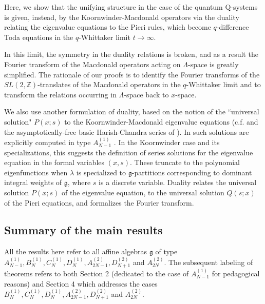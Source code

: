 \documentclass[12pt]{amsart}
\newcommand{\g}{{\mathfrak{g}}}
\newcommand{\Z}{{\mathbb Z}}
\newcommand{\lL}{{\Lambda}}
\numberwithin{equation}{section}
\begin{document}
Here, we show that the unifying structure in the case of the quantum Q-systems 
is given, instead, by the Koornwinder-Macdonald operators \cite{vDselfdual,Sahi,macdoroot} via the duality relating the eigenvalue equations to the Pieri rules, which become $q$-difference Toda equations \cite{Etingof,gotsy} in the $q$-Whittaker limit $t\to \infty$.
%

%
%
%

%
%
%
%
%
%
%
%
%


In this limit, the symmetry in the duality relations is broken, and as a result
%
the Fourier transform of the Macdonald operators acting on $\Lambda$-space is greatly simplified. 
%
The rationale of our proofs is to identify the Fourier transforms of the $SL(2,\Z)$-translates of the Macdonald operators in the $q$-Whittaker limit and to transform the relations occurring in $\lL$-space back to $x$-space.
%

We also use another formulation of duality, based on the notion of the ``universal solution" $P(x;s)$ to the Koornwinder-Macdonald eigenvalue equations (c.f. \cite{Cherednik95,cherednikqwhittaker} and the asymptotically-free basic Harish-Chandra series of \cite{Stokman}). In \cite{ShiraishiNoumi}  such solutions are explicitly computed in type $A_{N-1}^{(1)}$ . In the Koornwinder case and its specializations, this suggests the definition of series solutions for the eigenvalue equation in the formal variables $(x,s)$. These truncate to the polynomial eigenfunctions when $\lambda$ is specialized to $\g$-partitions corresponding to dominant integral weights of $\g$, where $s$ is a discrete variable. Duality relates the universal solution $P(x;s)$ of the eigenvalue equation, to the universal solution $Q(s;x)$ of the Pieri equations, and formalizes the Fourier transform.

\subsection{Summary of the main results}



All the results here refer to all affine algebras $\g$ of type $A_{N-1}^{(1)}, B_N^{(1)}, C_N^{(1)}, D_N^{(1)}, A_{2N-1}^{(2)}, D_{N+1}^{(2)}$ and $A_{2N}^{(2)}$. The subsequent labeling of theorems refers to both Section 2 (dedicated to the case of $A_{N-1}^{(1)}$ for pedagogical reasons)
and Section 4 which addresses the cases $B_N^{(1)}, C_N^{(1)}, D_N^{(1)}, A_{2N-1}^{(2)}, D_{N+1}^{(2)}$ and $A_{2N}^{(2)}$. 
\end{document}
